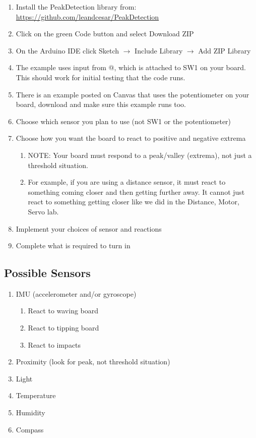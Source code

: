 \begin{enumerate}
    \item Install the PeakDetection library from:\\
          \href{https://github.com/leandcesar/PeakDetection}{https://github.com/leandcesar/PeakDetection}
    \item Click on the green Code button and select Download ZIP
    \item On the Arduino IDE click Sketch $\rightarrow$ Include Library $\rightarrow$ Add ZIP Library
    \item The example uses input from @, which is attached to SW1 on your board. 
            This should work for initial testing that the code runs.
    \item There is an example posted on Canvas that uses the potentiometer on your board, download
            and make sure this example runs too.
    \item Choose which sensor you plan to use (not SW1 or the potentiometer)
    \item Choose how you want the board to react to positive and negative extrema 
    \begin{enumerate}
        \item NOTE: Your board must respond to a peak/valley (extrema), not just a threshold situation.
        \item For example, if you are using a distance sensor, it must react to something
                coming closer and then getting further away. It cannot just react to something 
                getting closer like we did in the Distance, Motor, Servo lab.
    \end{enumerate}
    \item Implement your choices of sensor and reactions
    \item Complete what is required to turn in
\end{enumerate}

\subsection{Possible Sensors}
\begin{enumerate}
    \item IMU (accelerometer and/or gyroscope)
    \begin{enumerate}
        \item React to waving board
        \item React to tipping board 
        \item React to impacts
    \end{enumerate}
    \item Proximity (look for peak, not threshold situation)
    \item Light
    \item Temperature
    \item Humidity
    \item Compass
\end{enumerate}


